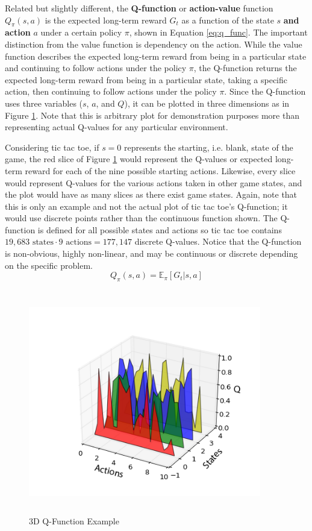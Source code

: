 Related but slightly different, the \textbf{Q-function} or \textbf{action-value} function $	Q_\pi(s,a)$ is the expected long-term reward $G_t$ as a function of the state $s$ \textbf{and action} $a$ under a certain policy $\pi$, shown in Equation \ref{eq:q_func}. The important distinction from the value function is dependency on the action. While the value function describes the expected long-term reward from being in a particular state and continuing to follow actions under the policy $\pi$, the Q-function returns the expected long-term reward from being in a particular state, taking a specific action, then continuing to follow actions under the policy $\pi$. Since the Q-function uses three variables ($s$, $a$, and $Q$), it can be plotted in three dimensions as in Figure \ref{fig:q_ex_plot}. Note that this is arbitrary plot for demonstration purposes more than representing actual Q-values for any particular environment. 

Considering tic tac toe, if $s=0$ represents the starting, i.e. blank, state of the game, the red slice of Figure \ref{fig:q_ex_plot} would represent the Q-values or expected long-term reward for each of the nine possible starting actions. Likewise, every slice would represent Q-values for the various actions taken in other game states, and the plot would have as many slices as there exist game states. Again, note that this is only an example and not the actual plot of tic tac toe's Q-function; it would use discrete points rather than the continuous function shown. The Q-function is defined for all possible states and actions so tic tac toe contains $19,683 \text{ states} \cdot 9 \text{ actions} = 177,147$ discrete Q-values. Notice that the Q-function is non-obvious, highly non-linear, and may be continuous or discrete depending on the specific problem.
\begin{equation}
	\label{eq:q_func}
	Q_\pi(s,a)=\mathbb{E}_\pi [G_t |s,a]
\end{equation}
\begin{figure}[H]   %
	\centering \includegraphics[width=4in, height=3.85in, keepaspectratio]{figures/q_ex_plot.png}
	\caption{3D Q-Function Example}\label{fig:q_ex_plot}
\end{figure}

